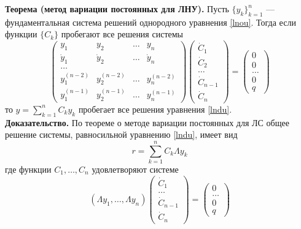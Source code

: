\noindent \textbf{Теорема (метод вариации постоянных для ЛНУ).} Пусть $\{y_k\}_{k=1}^n$ --- фундаментальная система решений однородного уравнения \eqref{lnou}. Тогда если функции $\{C_k\}$ пробегают все решения системы
\begin{equation*}
    \begin{pmatrix}
        y_1         & y_2         & \ldots & y_n          \\
        \dot{y}_1   & \dot{y}_2   & \ldots & \dot{y}_n    \\
        \ldots                                            \\
        y_1^{(n-2)} & y_2^{(n-2)} & \ldots & y_n^{(n -2)} \\
        y_1^{(n-1)} & y_2^{(n-1)} & \ldots & y_n^{(n-1)}
    \end{pmatrix}
    \begin{pmatrix}
        \dot{C}_{1}   \\
        \dot{C}_{2}   \\
        \ldots        \\
        \dot{C}_{n-1} \\
        \dot{C}_{n}
    \end{pmatrix}
    =
    \begin{pmatrix}
        0      \\
        0      \\
        \ldots \\
        0      \\
        q
    \end{pmatrix}
\end{equation*}
то $y = \displaystyle\sum_{k = 1}^n C_ky_k$ пробегает все решения уравнения \eqref{lndu}.\\

\noindent \textbf{Доказательство.} По теореме о методе вариации постоянных для ЛС общее решение системы, равносильной уравнению \eqref{lndu}, имеет вид
\begin{equation*}
    r = \sum_{k=1}^n C_k \Lambda y_k
\end{equation*}
где функции $C_1, \ldots, C_n$ удовлетворяют системе
\begin{equation*}
    (\Lambda y_1, \ldots, \Lambda y_n)
    \begin{pmatrix}
        \dot{C}_{1}   \\
        \ldots        \\
        \dot{C}_{n-1} \\
        \dot{C}_{n}
    \end{pmatrix}
    =
    \begin{pmatrix}
        0      \\
        \ldots \\
        0      \\
        q
    \end{pmatrix}
\end{equation*}

